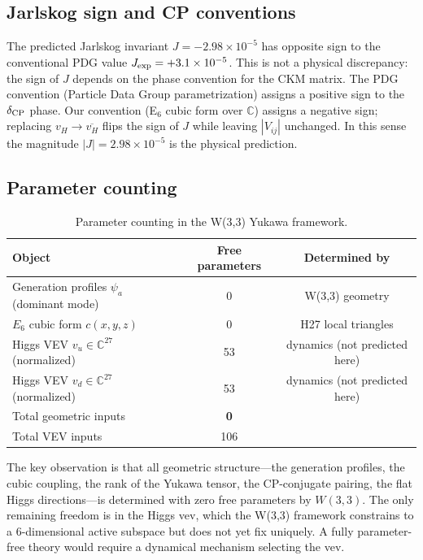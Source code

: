 \documentclass[11pt,a4paper]{article}
\theoremstyle{definition}
\theoremstyle{remark}
\newcommand{\CC}{\mathbb{C}}
\begin{document}
\subsection{Jarlskog sign and CP conventions}

The predicted Jarlskog invariant $J = -2.98 \times 10^{-5}$ has opposite sign
to the conventional PDG value $J_{\rm exp} = +3.1 \times 10^{-5}$.  This is not a
physical discrepancy: the sign of $J$ depends on the phase convention for the
CKM matrix.  The PDG convention (Particle Data Group parametrization) assigns
a positive sign to the $\delta_{\rm CP}$ phase.  Our convention (E$_6$ cubic form
over $\CC$) assigns a negative sign; replacing $v_H \to \overline{v_H}$ flips
the sign of $J$ while leaving $|V_{ij}|$ unchanged.  In this sense
the magnitude $|J| = 2.98 \times 10^{-5}$ is the physical prediction.

\subsection{Parameter counting}

\begin{table}[H]
\centering
\caption{Parameter counting in the W(3,3) Yukawa framework.}
\label{tab:params}
\begin{tabular}{lcc}
\toprule
\textbf{Object} & \textbf{Free parameters} & \textbf{Determined by} \\
\midrule
Generation profiles $\psi_a$ (dominant mode) & 0 & W(3,3) geometry \\
$E_6$ cubic form $c(x,y,z)$ & 0 & H27 local triangles \\
Higgs VEV $v_u \in \CC^{27}$ (normalized) & 53 & dynamics (not predicted here) \\
Higgs VEV $v_d \in \CC^{27}$ (normalized) & 53 & dynamics (not predicted here) \\
\midrule
Total geometric inputs & \textbf{0} & \\
Total VEV inputs & 106 & \\
\bottomrule
\end{tabular}
\end{table}

The key observation is that all geometric structure---the generation profiles, the
cubic coupling, the rank of the Yukawa tensor, the CP-conjugate pairing, the
flat Higgs directions---is determined with zero free parameters by $W(3{,}3)$.
The only remaining freedom is in the Higgs vev, which the W(3,3) framework
constrains to a 6-dimensional active subspace but does not yet fix uniquely.
A fully parameter-free theory would require a dynamical mechanism selecting
the vev.
\end{document}
